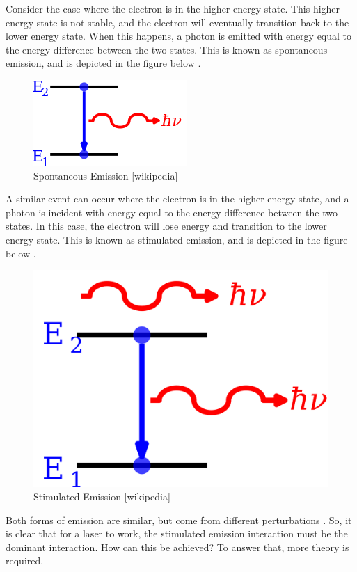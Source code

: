 \documentclass{article}
\begin{document}
Consider the case where the electron is in the higher energy state. This higher energy state is not stable, and the electron will eventually transition back to the lower energy state. When this happens, a photon is emitted with energy equal to the energy difference between the two states. This is known as spontaneous emission, and is depicted in the figure below \cite{Griffiths}.

\begin{figure}[h!]
    \begin{center}
    \includegraphics[width=0.5\linewidth]{Pictures/spontemission.png}
    \caption{Spontaneous Emission [wikipedia]}
    \label{fig:SpontEmission}
    \end{center}
\end{figure}


A similar event can occur where the electron is in the higher energy state, and a photon is incident with energy equal to the energy difference between the two states. In this case, the electron will lose energy and transition to the lower energy state. This is known as stimulated emission, and is depicted in the figure below \cite{Griffiths}.

\begin{figure}[h!]
    \begin{center}
    \includegraphics[width=0.5\linewidth]{Pictures/stimemission.png}
    \caption{Stimulated Emission [wikipedia]}
    \label{fig:Absorption}
    \end{center}
\end{figure}

Both forms of emission are similar, but come from different perturbations \cite{Griffiths}. So, it is clear that for a laser to work, the stimulated emission interaction must be the dominant interaction. How can this be achieved? To answer that, more theory is required.
\end{document}
